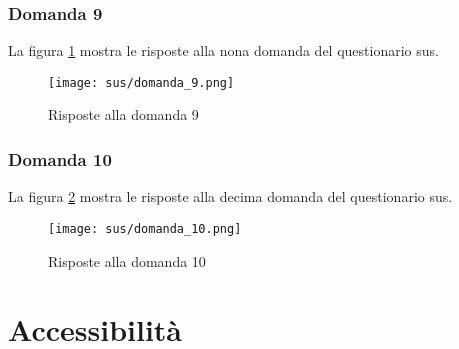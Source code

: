 \subsubsection*{Domanda 9}

\vspace{5pt}
\begin{minipage}{\textwidth}
  \par\noindent La figura \ref{fig:sus_q9} mostra le risposte alla nona domanda del questionario \gls{sus}.
  \begin{figure}[H]
    \centering
    \texttt{[image: sus/domanda\_9.png]}
    \caption{Risposte alla domanda 9}
    \label{fig:sus_q9}
  \end{figure}
\end{minipage}

\subsubsection*{Domanda 10}

\vspace{5pt}
\begin{minipage}{\textwidth}
  \par\noindent La figura \ref{fig:sus_q10} mostra le risposte alla decima domanda del questionario \gls{sus}.
  \begin{figure}[H]
    \centering
    \texttt{[image: sus/domanda\_10.png]}
    \caption{Risposte alla domanda 10}
    \label{fig:sus_q10}
  \end{figure}
\end{minipage}

\newpage

\section{Accessibilità}

